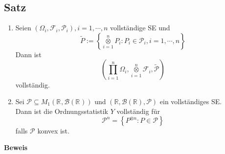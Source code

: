 \documentclass[german,10pt,oneside, fleqn, a4paper]{article}
\newcommand {\R}	{\mathbb{R}}
\newcommand{\brc}[1]{\left(#1\right)}
\newcommand{\brac}[1]{\left\lbrace #1\right\rbrace}
\newcommand{\mc}[1]{\mathcal{#1}}
\newcommand{\beweis}{\textbf{Beweis}\\}
\newcommand{\1}[1]{1_{#1}}
\newcommand{\2}[1]{\1{\brac{#1}}}
\newcommand{\rbor}[1][d]{\brc{\R^{#1},\mc{B}\brc{\R^{#1}}}}
\newcommand{\f}{\mc{F}}
\newcommand{\p}{\mc{P}}
\newcommand{\stuff}{{\otimes n}}
\DeclareMathOperator*{\kreuz}{\otimes}
\begin{document}
\subsection{Satz}
\label{12.2}
\begin{enumerate}[label=(\alph*)]
\item Seien $(\Omega_i,\f_i,\p_i),i=1,\cdots,n$ vollständige SE und \[
\tilde{P}:=\brac{\kreuz\limits_{i=1}^nP_i:P_i\in\p_i,i=1,\cdots,n}\]
Dann ist \[
\brc{\prod\limits_{i=1}^n\Omega_i,\kreuz\limits_{i=1}^n\f_i,\tilde{\p}}\]
vollständig.
\item Sei $\p\subseteq M_1\rbor[]$ und $(\R,\mc{B}(\R),\p)$ ein vollständiges SE.\\
Dann ist die Ordnungsstatistik $Y$ vollständig für \[
\p^n=\brac{P^\stuff:P\in\p}\]
falls $\p$ konvex ist.
\end{enumerate}
\beweis
\end{document}
